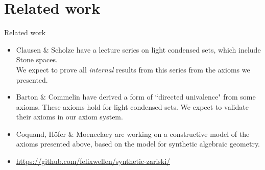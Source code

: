 \documentclass{beamer}
\begin{document}
\section{Related work}
\begin{frame}{Related work}
  \begin{itemize}
    \item 
    Clausen \& Scholze have a lecture series on light condensed sets, which include Stone spaces. \\
    \pause
    We expect to prove all \textit{internal} 
    results from this series from the axioms we presented. 
  \pause 
    \item 
      Barton \& Commelin have derived a form of ``directed univalence" from some axioms. \pause
      These axioms hold for light condensed sets. \pause
      We expect to validate their axioms in our axiom system. 
      \pause
    \item 
    Coquand, H\"ofer \& Moeneclaey are working on a 
    constructive model of the axioms presented above, 
    based on the model for synthetic algebraic geometry. 
    \pause 
  \item \url{https://github.com/felixwellen/synthetic-zariski/}
\end{itemize}
\end{frame}

\end{document}
